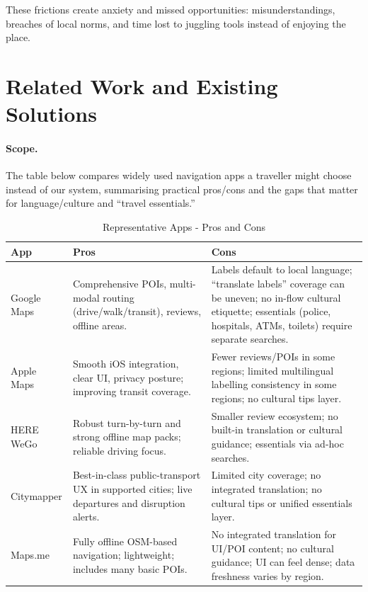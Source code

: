 \begin{sloppypar}
These frictions create anxiety and missed opportunities: misunderstandings, breaches of local norms, and time lost to juggling tools instead of enjoying the place.

\section{Related Work and Existing Solutions}
\paragraph{Scope.}
The table below compares widely used navigation apps a traveller might choose instead of our system, summarising practical pros/cons and the gaps that matter for language/culture and “travel essentials.”

\begin{table}[H]
  \centering
  \caption{Representative Apps - Pros and Cons}
  \label{tab:per-app}
  \begin{tabular}{|p{3cm}|p{5.2cm}|p{5.2cm}|}
    \hline
    \textbf{App} & \textbf{Pros} & \textbf{Cons} \\
    \hline
    Google Maps \cite{googlemaps} &
      Comprehensive POIs, multi-modal routing (drive/walk/transit), reviews, offline areas. &
      Labels default to local language; “translate labels” coverage can be uneven; no in-flow cultural etiquette; essentials (police, hospitals, ATMs, toilets) require separate searches. \\
    \hline
    Apple Maps \cite{applemaps} &
      Smooth iOS integration, clear UI, privacy posture; improving transit coverage. &
      Fewer reviews/POIs in some regions; limited multilingual labelling consistency in some regions; no cultural tips layer. \\
    \hline
    HERE WeGo \cite{herewego} &
      Robust turn-by-turn and strong offline map packs; reliable driving focus. &
      Smaller review ecosystem; no built-in translation or cultural guidance; essentials via ad-hoc searches. \\
    \hline
    Citymapper \cite{citymapper} &
      Best-in-class public-transport UX in supported cities; live departures and disruption alerts. &
      Limited city coverage; no integrated translation; no cultural tips or unified essentials layer. \\
    \hline
    Maps.me \cite{mapsme} &
      Fully offline OSM-based navigation; lightweight; includes many basic POIs. &
      No integrated translation for UI/POI content; no cultural guidance; UI can feel dense; data freshness varies by region. \\
    \hline
  \end{tabular}


\end{table}
\end{sloppypar}
